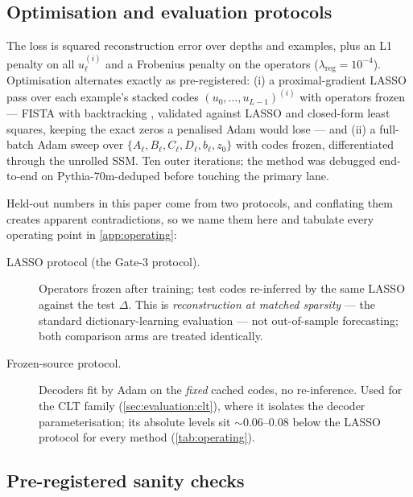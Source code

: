 \subsection{Optimisation and evaluation protocols}
\label{sec:decomposition:opt}

The loss is squared reconstruction error over depths and examples, plus an L1
penalty on all $u^{(i)}_\ell$ and a Frobenius penalty on the operators
($\lambda_{\mathrm{reg}} = 10^{-4}$). Optimisation alternates exactly as
pre-registered: (i) a proximal-gradient LASSO pass over each example's stacked
codes $(u_0,\dots,u_{L-1})^{(i)}$ with operators frozen --- FISTA with
backtracking \citep{beck2009fista}, validated against  LASSO
and closed-form least squares, keeping the exact zeros a penalised Adam would
lose --- and (ii) a full-batch Adam \citep{kingma2015adam} sweep over
$\{A_\ell,B_\ell,C_\ell,D_\ell,b_\ell,z_0\}$ with codes frozen, differentiated
through the unrolled SSM. Ten outer iterations; the method was debugged
end-to-end on Pythia-70m-deduped before touching the primary lane.

Held-out numbers in this paper come from two protocols, and conflating them
creates apparent contradictions, so we name them here and tabulate every
operating point in \cref{app:operating}:
\begin{description}
  \item[LASSO protocol (the Gate-3 protocol).] Operators frozen after
    training; test codes re-inferred by the same LASSO against the test
    $\Delta$. This is \emph{reconstruction at matched sparsity} --- the
    standard dictionary-learning evaluation --- not out-of-sample forecasting;
    both comparison arms are treated identically.
  \item[Frozen-source protocol.] Decoders fit by Adam on the \emph{fixed}
    cached codes, no re-inference. Used for the CLT family
    (\cref{sec:evaluation:clt}), where it isolates the decoder
    parameterisation; its absolute levels sit ${\sim}0.06$--$0.08$ below the
    LASSO protocol for every method (\cref{tab:operating}).
\end{description}

\subsection{Pre-registered sanity checks}
\label{sec:decomposition:sanity}

